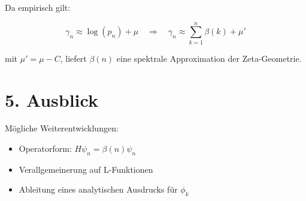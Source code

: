 \documentclass[12pt]{article}
\begin{document}
Da empirisch gilt:

\[
\gamma_n \approx \log(p_n) + \mu
\quad \Rightarrow \quad
\gamma_n \approx \sum_{k=1}^{n} \beta(k) + \mu'
\]

mit $\mu' = \mu - C$, liefert $\beta(n)$ eine spektrale Approximation der Zeta-Geometrie.

\section*{5. Ausblick}

Mögliche Weiterentwicklungen:
\begin{itemize}
    \item Operatorform: $H \psi_n = \beta(n) \psi_n$
    \item Verallgemeinerung auf L-Funktionen
    \item Ableitung eines analytischen Ausdrucks für $\phi_k$
\end{itemize}
\end{document}
